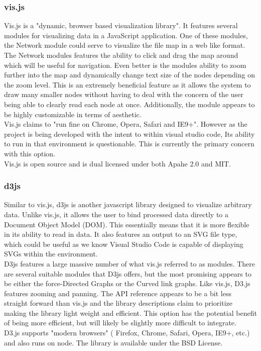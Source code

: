 \documentclass[letterpaper,10pt,titlepage,draftclsnofoot,onecolumn,onesided] {IEEEtran}
\begin{document}
\subsubsection{vis.js}
Vis.js is a "dynamic, browser based visualization library". 
It features several modules for visualizing data in a JavaScript application. 
One of these modules, the Network module could serve to visualize the file map in a web like format. 
The Network modules features the ability to click and drag the map around which will be useful for navigation. 
Even better is the modules ability to zoom further into the map and dynamically change text size of the nodes depending on the zoom level. 
This is an extremely beneficial feature as it allows the system to draw many smaller nodes without having to deal with the concern of the user being able to clearly read each node at once. 
Additionally, the module appears to be highly customizable in terms of aesthetic.
\\
Vis.js claims to "run fine on Chrome, Opera, Safari and IE9+". However as the project is being developed with the intent to within visual studio code, Its ability to run in that environment is questionable. This is currently the primary concern with this option.
\\
Vis.js  is open source and is dual licensed under both Apahe 2.0 and MIT.

\subsubsection{d3js}
Similar to vis.js, d3js is another javascript library designed to visualize arbitrary data. 
Unlike vis.js, it allows the user to bind processed data directly to a Document Object Model (DOM). 
This essentially means that it is more flexible in its ability to read in data. 
It also features an output to an SVG file type, which could be useful as we know Visual Studio Code is capable of displaying SVGs within the environment. 
\\
D3js features a large massive number of what vis.js referred to as modules. 
There are several suitable modules that D3js offers, but the most promising appears to be either the force-Directed Graphs or the Curved link graphs. 
Like vis.js, D3.js features zooming and panning. 
The API reference appears to be a bit less straight forward than vis.js and the library descriptions claim to prioritize making the library light weight and efficient. 
This option has the potential benefit of being more efficient, but will likely be slightly more difficult to integrate.
\\
D3.js supports "modern browsers" ( Firefox, Chrome, Safari, Opera, IE9+, etc.) and also runs on node. 
The library is available under the BSD License.
\end{document}
